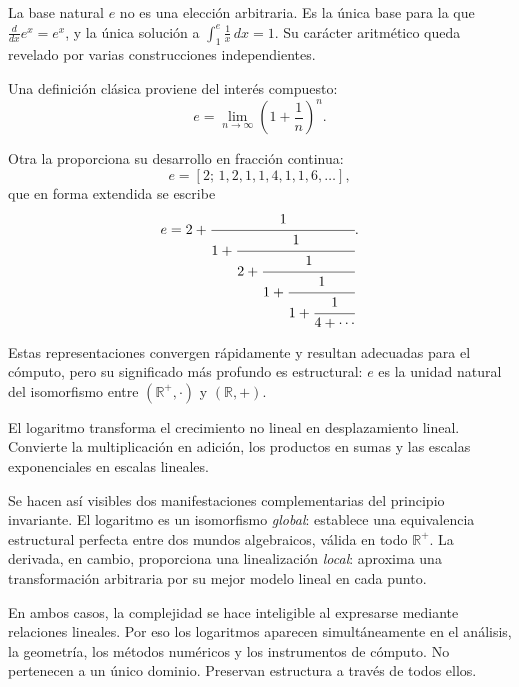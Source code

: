 
\medskip

La base natural $e$ no es una elección arbitraria.
Es la única base para la que $\frac{d}{dx}e^x = e^x$,
y la única solución a $\int_1^e \frac{1}{x}\,dx = 1$.
Su carácter aritmético queda revelado por varias construcciones independientes.

\medskip

Una definición clásica proviene del interés compuesto:
\[
e = \lim_{n\to\infty}\left(1+\frac{1}{n}\right)^n.
\]

Otra la proporciona su desarrollo en fracción continua:
\[
e = [2;\,1,2,1,1,4,1,1,6,\dots],
\]
que en forma extendida se escribe
\[
e
=
2 + \cfrac{1}{1 + \cfrac{1}{2 + \cfrac{1}{1 + \cfrac{1}{1 + \cfrac{1}{4 + \cdots}}}}}.
\]

Estas representaciones convergen rápidamente y resultan adecuadas para el
cómputo, pero su significado más profundo es estructural:
$e$ es la unidad natural del isomorfismo entre $(\mathbb{R}^+,\cdot)$
y $(\mathbb{R},+)$.


\medskip

El logaritmo transforma el crecimiento no lineal en desplazamiento lineal.
Convierte la multiplicación en adición, los productos en sumas
y las escalas exponenciales en escalas lineales.

\medskip

Se hacen así visibles dos manifestaciones complementarias del principio
invariante.
El logaritmo es un isomorfismo \emph{global}:
establece una equivalencia estructural perfecta entre dos mundos algebraicos,
válida en todo $\mathbb{R}^+$.
La derivada, en cambio, proporciona una linealización \emph{local}:
aproxima una transformación arbitraria por su mejor modelo lineal en cada punto.

\medskip

En ambos casos, la complejidad se hace inteligible al expresarse mediante
relaciones lineales.
Por eso los logaritmos aparecen simultáneamente en el análisis, la geometría,
los métodos numéricos y los instrumentos de cómputo.
No pertenecen a un único dominio.
Preservan estructura a través de todos ellos.